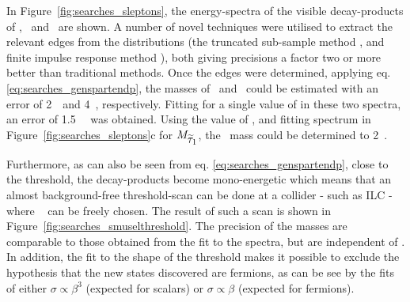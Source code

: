 In Figure~\ref{fig:searches_sleptons},
the energy-spectra of the visible decay-products of 
\selr , \smu~and \stone~are shown.
A number of novel techniques were utilised
to extract the relevant edges from the distributions
(the truncated sub-sample method  \cite{Berggren:2015qua},
and finite impulse response method \cite{Caiazza:416980}),
both giving precisions a factor two or more better than
traditional methods.
Once the edges were determined,
applying eq. \ref{eq:searches_genspartendp},
the masses of \selr~and  \smur~could 
be estimated with an error of 2~\permil~and
4~\permil, respectively.
Fitting for a single value of  in these two spectra,
an error of 1.5~\permil~ was obtained.
Using the value of  ,
and fitting spectrum in Figure~\ref{fig:searches_sleptons}c for $M_{\mbox{$ \widetilde{\tau}_1 $}} $,
the  \stone~mass could be determined to 2~\permil.

Furthermore, 
as can also be seen from eq. \ref{eq:searches_genspartendp},
close to the threshold,
the decay-products become mono-energetic which means
that an almost background-free threshold-scan can be done
at a collider - such as ILC - where \Ecms~ can be freely chosen.
The result of such a scan is shown in Figure~\ref{fig:searches_smuselthreshold}.
The precision of the masses are comparable to those
obtained from the fit to the spectra,
but are independent of .
In addition,
the fit to the shape of the threshold makes it possible to
exclude the hypothesis that the new states discovered are
fermions,
as can be see by the fits of either $\sigma \propto \beta^3$ (expected for
scalars) or
 $\sigma \propto \beta$ (expected for fermions). 
 
